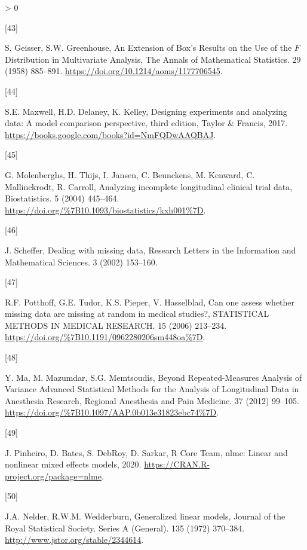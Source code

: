 \documentclass[
]{article}
\newlength{\cslhangindent}
\newlength{\csllabelwidth}
\newenvironment{CSLReferences}[2] %
 {%
  \setlength{\parindent}{0pt}
  \ifodd #1 \everypar{\setlength{\hangindent}{\cslhangindent}}\ignorespaces\fi
  \ifnum #2 > 0
  \setlength{\parskip}{#2\baselineskip}
  \fi
 }%
 {}
\newcommand{\CSLLeftMargin}[1]{\parbox[t]{\csllabelwidth}{#1}}
\newcommand{\CSLRightInline}[1]{\parbox[t]{\linewidth - \csllabelwidth}{#1}\break}
\begin{document}
\begin{CSLReferences}{0}{0}
\leavevmode\hypertarget{ref-geisser1958}{}%
\CSLLeftMargin{{[}43{]} }
\CSLRightInline{S. Geisser, S.W. Greenhouse, {An Extension of Box's Results on the Use of the \(F\) Distribution in Multivariate Analysis}, The Annals of Mathematical Statistics. 29 (1958) 885--891. \url{https://doi.org/10.1214/aoms/1177706545}.}

\leavevmode\hypertarget{ref-maxwell2017}{}%
\CSLLeftMargin{{[}44{]} }
\CSLRightInline{S.E. Maxwell, H.D. Delaney, K. Kelley, Designing experiments and analyzing data: A model comparison perspective, third edition, Taylor \& Francis, 2017. \url{https://books.google.com/books?id=NmFQDwAAQBAJ}.}

\leavevmode\hypertarget{ref-molenberghs2004}{}%
\CSLLeftMargin{{[}45{]} }
\CSLRightInline{G. Molenberghs, H. Thijs, I. Jansen, C. Beunckens, M. Kenward, C. Mallinckrodt, R. Carroll, {Analyzing incomplete longitudinal clinical trial data}, {Biostatistics}. {5} (2004) 445--464. \url{https://doi.org/\%7B10.1093/biostatistics/kxh001\%7D}.}

\leavevmode\hypertarget{ref-scheffer2002}{}%
\CSLLeftMargin{{[}46{]} }
\CSLRightInline{J. Scheffer, Dealing with missing data, Research Letters in the Information and Mathematical Sciences. 3 (2002) 153--160.}

\leavevmode\hypertarget{ref-potthoff2006}{}%
\CSLLeftMargin{{[}47{]} }
\CSLRightInline{R.F. Potthoff, G.E. Tudor, K.S. Pieper, V. Hasselblad, {Can one assess whether missing data are missing at random in medical studies?}, {STATISTICAL METHODS IN MEDICAL RESEARCH}. {15} (2006) 213--234. \url{https://doi.org/\%7B10.1191/0962280206sm448oa\%7D}.}

\leavevmode\hypertarget{ref-ma2012}{}%
\CSLLeftMargin{{[}48{]} }
\CSLRightInline{Y. Ma, M. Mazumdar, S.G. Memtsoudis, {Beyond Repeated-Measures Analysis of Variance Advanced Statistical Methods for the Analysis of Longitudinal Data in Anesthesia Research}, {Regional Anesthesia and Pain Medicine}. {37} (2012) 99--105. \url{https://doi.org/\%7B10.1097/AAP.0b013e31823ebc74\%7D}.}

\leavevmode\hypertarget{ref-nlme}{}%
\CSLLeftMargin{{[}49{]} }
\CSLRightInline{J. Pinheiro, D. Bates, S. DebRoy, D. Sarkar, R Core Team, {nlme}: Linear and nonlinear mixed effects models, 2020. \url{https://CRAN.R-project.org/package=nlme}.}

\leavevmode\hypertarget{ref-nelder1972}{}%
\CSLLeftMargin{{[}50{]} }
\CSLRightInline{J.A. Nelder, R.W.M. Wedderburn, Generalized linear models, Journal of the Royal Statistical Society. Series A (General). 135 (1972) 370--384. \url{http://www.jstor.org/stable/2344614}.}


\end{CSLReferences}
\end{document}
